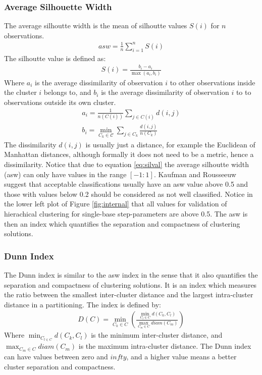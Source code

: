 \subsubsection{Average Silhouette Width}
The average silhoutte width is the mean of silhoutte values $S(i)$
for $n$ observations.
\begin{gather}
asw = \frac{1}{n} \sum_{i=1}^{n} S(i)
\end{gather}  
The silhoutte value is defined as:
\begin{gather}
\label{eq:silval}  
S(i) = \frac{b_{i}-a_{i}}{\max(a_{i},b_{i})}
\end{gather}
Where $a_{i}$ is the average dissimilarity of observation $i$ to other
observations inside the cluster $i$ belongs to, and
$b_{i}$ is the average dissimilarity of observation $i$ to to
observations outside its own cluster. 
\begin{gather}
a_{i} = \frac{1}{n(C(i))} \sum_{j \in C(i)} d(i,j)\\
b_{i} = \min_{C_{k} \in \mathcal{C}} \sum_{j \in C_{k}}\frac{d(i,j)}{n(C_{k})}
\end{gather}  
The dissimilarity $d(i,j)$ is usually just a distance, for example the
Euclidean of  Manhattan distances, although formally it  does not need
to be  a metric, hence a  dissimilarity.  Notice that  due to equation
\ref{eq:silval}  the  average silhoutte  width  (asw)  can only  have
values    in   the    range   $[-1:1]$.     Kaufman    and   Rousseeuw
\cite{kaufman1990}  suggest  that  acceptable classifications  usually
have an asw value above 0.5  and those with values below 0.2 should be
considered as not  well classified.  Notice in the  lower left plot of
Figure   \ref{fig:internal}  that   all  values   for   validation  of
hierachical clustering for  single-base step-parameters are above 0.5.
The  asw  is  then  an  index  which  quantifies  the  separation  and
compactness of clustering solutions.

\subsubsection{Dunn Index}
The Dunn index is  similar to the asw index in the  sense that it also
quantifies the separation and  compactness of clustering solutions. It
is   an  index  which   measures  the   ratio  between   the  smallest
inter-cluster  distance and  the largest  intra-cluster distance  in a
partitioning.  The index is defined by:
\begin{gather}
D(C) = \min_{C_{k} \in C} \left(  \frac{\min_{C_{l} \in C}
  d(C_{k},C_{l})}{\max_{C_{m} \in C} diam(C_{m})} \right)
\end{gather}
Where $\min_{C_{l \in C}} d(C_{k},C_{l})$ is the minimum inter-cluster
distance,  and  $\max_{C_{m}  \in   C}  diam(C_{m})$  is  the  maximum
intra-cluster distance.   The Dunn index can have  values between zero
and $infty$, and a higher  value means a better cluster separation and
compactness.

